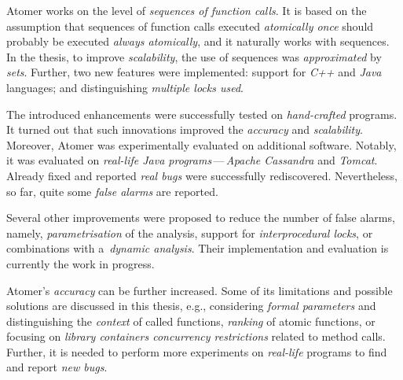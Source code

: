 Atomer works on the level of \emph{sequences of function calls}. It is
based on the assumption that sequences of function calls executed
\emph{atomically once} should probably be executed \emph{always atomically},
and it naturally works with sequences. In the thesis, to improve
\emph{scalability}, the use of sequences was \emph{approximated} by
\emph{sets}. Further, two new features were implemented: support for
\emph{C++} and \emph{Java} languages; and distinguishing \emph{multiple
locks used}.

The introduced enhancements were successfully tested on \emph{hand-crafted}
programs. It turned out that such innovations improved the \emph{accuracy}
and \emph{scalability}. Moreover, Atomer was experimentally evaluated on
additional software. Notably, it was evaluated on \emph{real-life Java
programs}\,---\,\emph{Apache Cassandra} and \emph{Tomcat}. Already fixed
and reported \emph{real bugs} were successfully rediscovered. Nevertheless,
so far, quite some \emph{false alarms} are reported.

Several other improvements were proposed to reduce the number of false
alarms, namely, \emph{parametrisation} of the analysis, support for
\emph{interprocedural locks}, or combinations with a~\emph{dynamic analysis}.
Their implementation and evaluation is currently the work in progress.

Atomer's \emph{accuracy} can be further increased. Some of its limitations
and possible solutions are discussed in this thesis, e.g., considering
\emph{formal parameters} and distinguishing the \emph{context} of
called functions, \emph{ranking} of atomic functions, or focusing on
\emph{library containers concurrency restrictions} related to method
calls. Further, it is needed to perform more experiments on \emph{real-life}
programs to find and report \emph{new bugs}.



